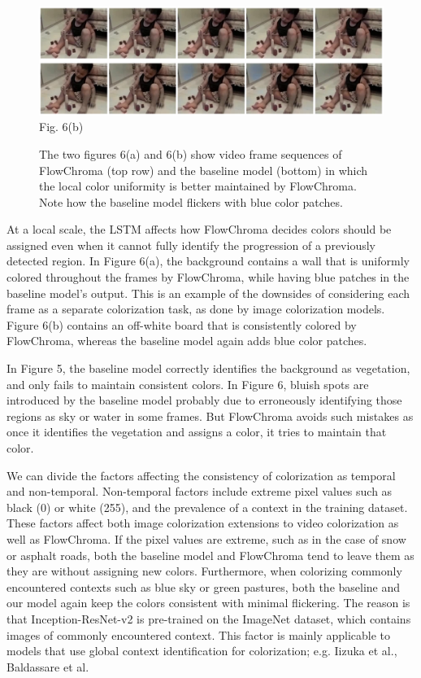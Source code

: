 \documentclass[10pt,twocolumn,letterpaper]{article}
\begin{document}
\begin{figure}[!h]
\includegraphics[width=\textwidth]{fc-dk-playing.png}
\centering
\label{}{\footnotesize Fig. 6(b)}
\caption{The two figures 6(a) and 6(b) show video frame sequences of FlowChroma (top row) and the baseline model (bottom) in which the local color uniformity is better maintained by FlowChroma. Note how the baseline model flickers with blue color patches.}
\end{figure}

At a local scale, the LSTM affects how FlowChroma decides colors should be assigned even when it cannot fully identify the progression of a previously detected region. In Figure 6(a), the background contains a wall that is uniformly colored throughout the frames by FlowChroma, while having blue patches in the baseline model’s output. This is an example of the downsides of considering each frame as a separate colorization task, as done by image colorization models. Figure 6(b) contains an off-white board that is consistently colored by FlowChroma, whereas the baseline model again adds blue color patches.

In Figure 5, the baseline model correctly identifies the background as vegetation, and only fails to maintain consistent colors. In Figure 6, bluish spots are introduced by the baseline model probably due to erroneously identifying those regions as sky or water in some frames. But FlowChroma avoids such mistakes as once it identifies the vegetation and assigns a color, it tries to maintain that color.

We can divide the factors affecting the consistency of colorization as temporal and non-temporal. Non-temporal factors include extreme pixel values such as black (0) or white (255), and the prevalence of a context in the training dataset. These factors affect both image colorization extensions to video colorization as well as FlowChroma. If the pixel values are extreme, such as in the case of snow or asphalt roads, both the baseline model and FlowChroma tend to leave them as they are without assigning new colors. Furthermore, when colorizing commonly encountered contexts such as blue sky or green pastures, both the baseline and our model again keep the colors consistent with minimal flickering. The reason is that Inception-ResNet-v2 is pre-trained on the ImageNet dataset, which contains  images of commonly encountered context. This factor is mainly applicable to models that use global context identification for colorization; e.g. Iizuka et al., Baldassare et al.
\end{document}
